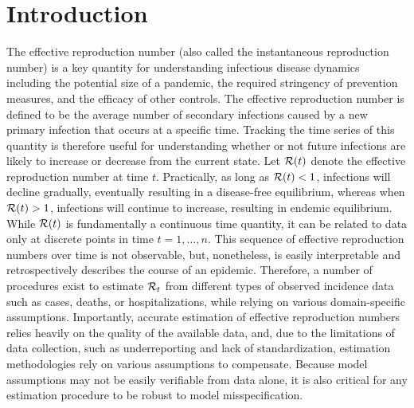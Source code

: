 \section{Introduction}
\label{sec:intro}

The effective reproduction number (also called the instantaneous reproduction
number) is a key quantity for understanding infectious disease dynamics
including the potential size of a pandemic, the required stringency of
prevention measures, and the efficacy of other controls. The effective
reproduction number is defined to be the average number of secondary infections
caused by a new primary infection that occurs at a specific time. Tracking the
time series of this quantity is therefore useful for understanding whether or
not future infections are likely to increase or decrease from the current state.
Let $\mathcal{R}(t)$ denote the effective reproduction number at time $t$.
Practically, as long as $\mathcal{R}(t) < 1$, infections will decline gradually,
eventually resulting in a disease-free equilibrium, whereas when $\mathcal{R}(t) > 1$,
infections will continue to increase, resulting in endemic equilibrium. 
While $\mathcal{R}(t)$ is fundamentally a continuous time quantity, it can be related
to data only at discrete points in time $t = 1,\ldots,n$.
This sequence of effective reproduction numbers over time is not observable, but,
nonetheless, is easily interpretable and retrospectively describes the course of
an epidemic. Therefore, a number of procedures exist to estimate $\mathcal{R}_t$ from
different types of observed incidence data such as cases, deaths, or
hospitalizations, while relying on various domain-specific assumptions.
Importantly, accurate estimation of effective reproduction numbers relies
heavily on the quality of the available data, and, due to the limitations of
data collection, such as underreporting and lack of standardization,
estimation methodologies rely on various assumptions to
compensate. Because model assumptions may not be easily verifiable from data
alone, it is also critical for any estimation procedure to be robust to model
misspecification. 

